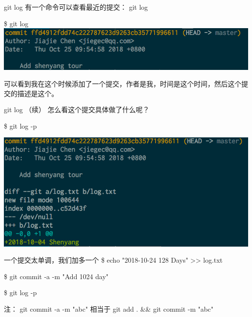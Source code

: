 \documentclass{beamer}
\begin{document}
\begin{frame}{git log}
    有一个命令可以查看最近的提交： git log

    \$ git log
    \includegraphics[width=\linewidth]{2018-10-25-09-59-01.png}

    可以看到我在这个时候添加了一个提交，作者是我，时间是这个时间，然后这个提交的描述是这个。

\end{frame}
\begin{frame}{git log （续）}
    怎么看这个提交具体做了什么呢？

    \$ git log -p

    \includegraphics[width=\linewidth]{2018-10-25-10-01-41.png}
\end{frame}

\begin{frame}{一个提交太单调，我们加多一个}
    \$ echo "2018-10-24 128 Days" >{}> log.txt

    \$ git commit -a -m "Add 1024 day"

    \$ git log -p

    注： git commit -a -m "abc" 相当于 git add . \&\& git commit -m "abc"

\end{frame}
\end{document}
